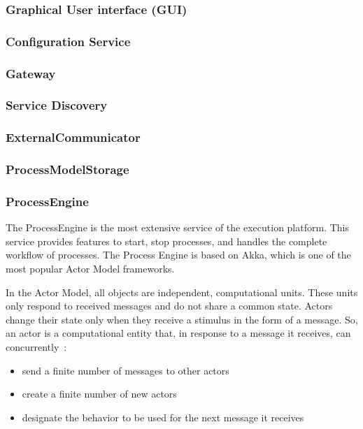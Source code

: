 \documentclass[conference]{IEEEtran}
\newcommand{\citep}{\cite}
\begin{document}
\subsubsection{Graphical User interface (GUI)}

\subsubsection{Configuration Service}

\subsubsection{Gateway}

\subsubsection{Service Discovery} 

\subsubsection{ExternalCommunicator}

\subsubsection{ProcessModelStorage}

\subsubsection{ProcessEngine}

The ProcessEngine is the most extensive service of the execution platform. This service provides features to start, stop processes, and handles the complete workflow of processes. The Process Engine is based on Akka, which is one of the most popular Actor Model frameworks. 

In the Actor Model, all objects are independent, computational units. These units only respond to received messages and do not share a common state. Actors change their state only when they receive a stimulus in the form of a message. So, an actor is a computational entity that, in response to a message it receives, can concurrently~\citep{Gupta:2012}:

\begin{itemize}
	\item send a finite number of messages to other actors
	\item create a finite number of new actors
	\item designate the behavior to be used for the next message it receives
\end{itemize}
\end{document}
